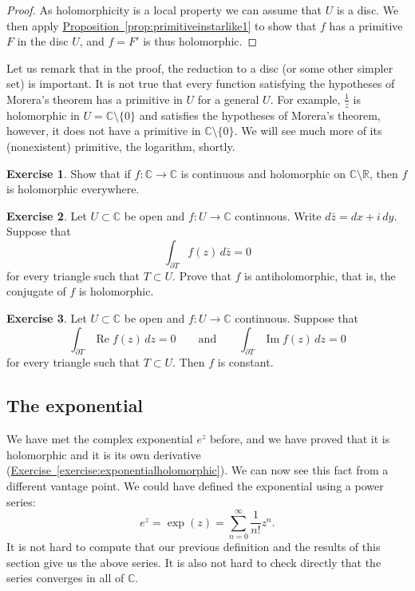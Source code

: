 \documentclass[12pt,openany]{book}
\renewcommand{\Re}{\operatorname{Re}}
\renewcommand{\Im}{\operatorname{Im}}
\newcommand{\C}{{\mathbb{C}}}
\newcommand{\R}{{\mathbb{R}}}
\theoremstyle{plain}
\theoremstyle{remark}
\theoremstyle{definition}
\newenvironment{exbox}{%
    \def\FrameCommand{\vrule width 1pt \relax\hspace {10pt}}%
    \MakeFramed {\advance \hsize -\width \FrameRestore }%
}{%
    \endMakeFramed
}
\theoremstyle{exercise}
\newtheorem{exercise}{Exercise}[section]
\theoremstyle{example}
\newcommand{\exerciseref}[1]{\hyperref[#1]{Exercise~\ref*{#1}}}
\newcommand{\propref}[1]{\hyperref[#1]{Proposition~\ref*{#1}}}
\begin{document}
\begin{proof}
As holomorphicity is a local property we can assume that $U$ is a disc.
We then apply \propref{prop:primitiveinstarlike1} to show that $f$ has
a primitive $F$ in the disc $U$, and $f = F'$ is thus holomorphic.
\end{proof}

Let us remark that in the proof,
the reduction to a disc (or some other simpler set)
is important.  It is not true
that every function satisfying the hypotheses of Morera's theorem has a
primitive in $U$ for a general $U$.  For example, $\frac{1}{z}$ is
holomorphic in $U = \C \setminus \{ 0 \}$ and satisfies the hypotheses of
Morera's theorem, however, it does not have a primitive
in $\C \setminus \{ 0 \}$.  We will see much
more of its (nonexistent) primitive, the logarithm, shortly.

\begin{exbox}
\begin{exercise}
Show that if $f \colon \C \to \C$ is continuous and holomorphic on $\C
\setminus \R$, then $f$ is holomorphic everywhere.
\end{exercise}

\begin{exercise}
Let $U \subset \C$ be open and $f \colon U \to \C$ continuous.
Write $d\bar{z} = dx + i \, dy$.
Suppose that
\begin{equation*}
\int_{\partial T} f(z) \, d\bar{z} = 0
\end{equation*}
for every triangle such that $T \subset U$.  Prove that $f$
is antiholomorphic, that is, the conjugate of $f$ is holomorphic.
\end{exercise}

\begin{exercise}
Let $U \subset \C$ be open and $f \colon U \to \C$ continuous.
Suppose that
\begin{equation*}
\int_{\partial T} \Re f(z) \, dz = 0
\qquad \text{and} \qquad
\int_{\partial T} \Im f(z) \, dz = 0
\end{equation*}
for every triangle such that $T \subset U$.  Then $f$ is constant.
\end{exercise}
\end{exbox}

\subsection{The exponential}

We have met the complex exponential $e^z$ before, and we have proved
that it is holomorphic and it is its own derivative
(\exerciseref{exercise:exponentialholomorphic}).  We can now see this fact
from a different vantage point.  We could have defined the exponential
using a power series:
\begin{equation*}
e^z = \exp(z) = \sum_{n=0}^\infty \frac{1}{n!} z^n .
\end{equation*}
It is not hard to compute that our previous definition and the results
of this section give us the above series.  It is also not hard to check
directly that the series converges in all of $\C$.
\end{document}
